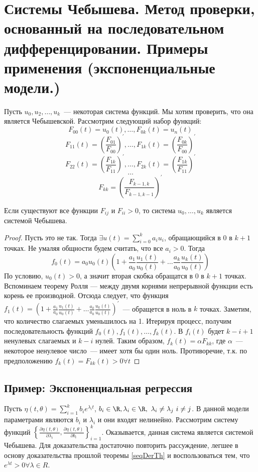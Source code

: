 
\section{Системы Чебышева. Метод проверки, основанный на последовательном дифференцировании. Примеры применения (экспоненциальные модели.)}

Пусть $u_0, u_2,…, u_k$ — некоторая система функций. Мы хотим проверить, что она является Чебышевской. 
Рассмотрим следующий набор функций:
$$ F_{00}(t) = u_0(t), …, F_{0k}(t) = u_n(t)$$
$$F_{11}(t) = \left(\frac{F_{01}}{F_{00}}\right)^{'}, …, F_{1k}(t) = \left(\frac{F_{0k}}{F_{00}}\right)^{'}$$
$$F_{22}(t) = \left(\frac{F_{1k}}{F_{11}}\right)^{'}, …, F_{2k}(t) = \left(\frac{F_{1k}}{F_{11}}\right)^{'} $$
$$ … $$
$$F_{kk} = \left(\frac{F_{k-1, k}}{F_{k-1, k-1}}\right)^{'}$$
\begin{thm}
\label{seqDerTh}
Если существуют все функции $F_{ij}$ и $F_{ii} > 0$, то система $u_0, …, u_k$ является системой Чебышева.
\end{thm}
\begin{proof}
Пусть это не так. Тогда $\exists u(t) = \sum \limits_{i=0}^{k} a_i u_i$, обращающийся в 0 в $k+1$ точках. Не умаляя общности будем считать, что все $a_i > 0$. Тогда 
$$ f_0(t) = a_0u_0(t)\left(1 + \frac{a_1}{a_0} \frac{u_1(t)}{u_0(t)} + … \frac{a_k}{a_0}\frac{u_k(t)}{u_0(t)}\right)$$
По условию, $u_0(t) > 0$, а значит вторая скобка обращатся в 0 в $k+1$ точках. Вспоминаем теорему Ролля — между двумя корнями непрерывной функции есть корень ее производной. Отсюда следует, что функция 
$f_1(t) = \left(1 + \frac{a_1}{a_0} \frac{u_1(t)}{u_0(t)} + … \frac{a_k}{a_0}\frac{u_k(t)}{u_0(t)}\right)^{'}$ — обращется в ноль в $k$ точках. Заметим, что количество слагаемых уменьшилось на 1. Итерируя процесс, получим 
последовательность функций $f_0(t), f_1(t), …, f_k(t)$. В $f_i(t)$ будет $k-i+1$ ненулевых слагаемых и $k-i$ нулей. Таким образом, $f_k(t) = \alpha F_{kk}$, где $\alpha$ — некоторое ненулевое число — имеет хотя бы один ноль. Противоречие, т.к. по предположению $f_k(t) = F_{kk}(t) > 0 \forall t$
\end{proof}
\subsection{Пример: Экспоненциальная регрессия}
Пусть $\eta(t, \theta) = \sum\limits_{i=1}^k b_i e^{\lambda_it}$, $b_i \in \R, \lambda_i \in \R, \lambda_i \neq \lambda_j i \neq j$. В данной модели параметрами являются $b_i$ и $\lambda_i$ и они входят нелинейно. Рассмотрим систему функций 
$\left\{ \frac{\partial \eta(t, \theta)}{\partial \lambda_i}, \frac{\partial \eta(t, \theta)}{\partial b_i} \right\}_{i=1}^{k}$. Оказывается, данная система является системой Чебышева. Для доказательства достаточно повторить рассуждение, легшее в основу доказательства прошлой теоремы \eqref{seqDerTh} и воспользоваться тем, что $e^{\lambda t} > 0 \forall \lambda \in R$.

